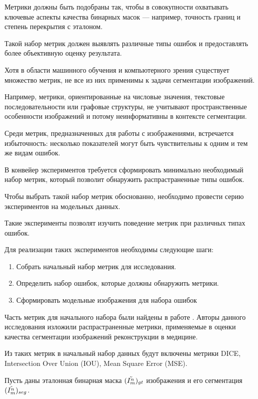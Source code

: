 Метрики должны быть подобраны так, чтобы в совокупности охватывать ключевые аспекты качества бинарных масок — например, точность границ и степень перекрытия с эталоном. 

Такой набор метрик должен выявлять различные типы ошибок и предоставлять более объективную оценку результата.

Хотя в области машинного обучения и компьютерного зрения существует множество метрик, не все из них применимы к задачи сегментации изображений. 

Например, метрики, ориентированные на числовые значения, текстовые последовательности или графовые структуры, не учитывают пространственные особенности изображений и потому неинформативны в контексте сегментации.

Среди метрик, предназначенных для работы с изображениями, встречается избыточность: несколько показателей могут быть чувствительны к одним и тем же видам ошибок.

В конвейер экспериментов требуется сформировать минимально необходимый набор  метрик, который позволит обнаружить распрастраненные типы ошибок.

Чтобы выбрать такой набор метрик обоснованно, необходимо провести серию экспериментов на модельных данных.

Такие эксперименты позволят изучить поведение метрик при различных типах ошибок.

Для реализации таких экспериментов необходимы следующие шаги:

\begin{enumerate}
    \item Собрать начальный набор метрик для исследования.
    \item Определить набор ошибок, которые должны обнаружить метрики.
    \item Сформировать модельные изображения для набора ошибок
\end{enumerate}

Часть метрик для начального набора были найдены в работе \cite{taha2015metrics}. Авторы данного исследования изложили распрастраненные метрики, применяемые в оценки качества сегментации изображений реконструкции в медицине.

Из таких метрик в начальный набор данных будут включены метрики DICE, Intersection Over Union (IOU), Mean Square Error (MSE).

Пусть даны эталонная бинарная маска \((\tilde{I^n_m})_{gt}\) изображения и его сегментация \((\tilde{I^n_m})_{seg}\).


